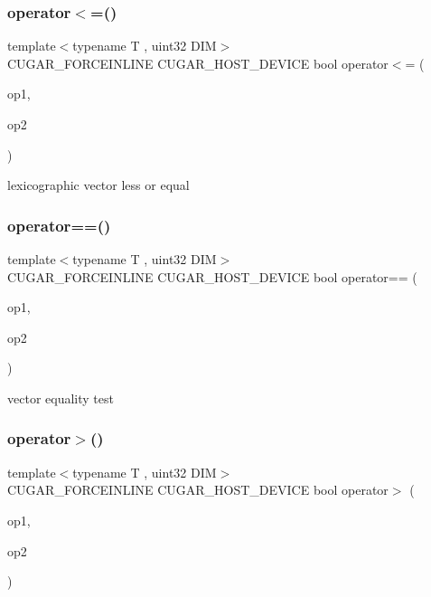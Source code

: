\subsubsection{\texorpdfstring{operator$<$=()}{operator<=()}}
{\footnotesize\ttfamily template$<$typename T , uint32 D\+IM$>$ \\
C\+U\+G\+A\+R\+\_\+\+F\+O\+R\+C\+E\+I\+N\+L\+I\+NE C\+U\+G\+A\+R\+\_\+\+H\+O\+S\+T\+\_\+\+D\+E\+V\+I\+CE bool operator$<$= (\begin{DoxyParamCaption}\item[{const \hyperlink{structcugar_1_1_vector}{Vector}$<$ T, D\+IM $>$ \&}]{op1,  }\item[{const \hyperlink{structcugar_1_1_vector}{Vector}$<$ T, D\+IM $>$ \&}]{op2 }\end{DoxyParamCaption})\hspace{0.3cm}{\ttfamily [related]}}

lexicographic vector less or equal \mbox{\label{group___vectors_module_ga04e707ea52066620e6b6d0e6672712e7}} 
\subsubsection{\texorpdfstring{operator==()}{operator==()}}
{\footnotesize\ttfamily template$<$typename T , uint32 D\+IM$>$ \\
C\+U\+G\+A\+R\+\_\+\+F\+O\+R\+C\+E\+I\+N\+L\+I\+NE C\+U\+G\+A\+R\+\_\+\+H\+O\+S\+T\+\_\+\+D\+E\+V\+I\+CE bool operator== (\begin{DoxyParamCaption}\item[{const \hyperlink{structcugar_1_1_vector}{Vector}$<$ T, D\+IM $>$ \&}]{op1,  }\item[{const \hyperlink{structcugar_1_1_vector}{Vector}$<$ T, D\+IM $>$ \&}]{op2 }\end{DoxyParamCaption})\hspace{0.3cm}{\ttfamily [related]}}

vector equality test \mbox{\label{group___vectors_module_ga22458d0373234955592695abc8d9d6f0}} 
\subsubsection{\texorpdfstring{operator$>$()}{operator>()}}
{\footnotesize\ttfamily template$<$typename T , uint32 D\+IM$>$ \\
C\+U\+G\+A\+R\+\_\+\+F\+O\+R\+C\+E\+I\+N\+L\+I\+NE C\+U\+G\+A\+R\+\_\+\+H\+O\+S\+T\+\_\+\+D\+E\+V\+I\+CE bool operator$>$ (\begin{DoxyParamCaption}\item[{const \hyperlink{structcugar_1_1_vector}{Vector}$<$ T, D\+IM $>$ \&}]{op1,  }\item[{const \hyperlink{structcugar_1_1_vector}{Vector}$<$ T, D\+IM $>$ \&}]{op2 }\end{DoxyParamCaption})\hspace{0.3cm}{\ttfamily [related]}}

